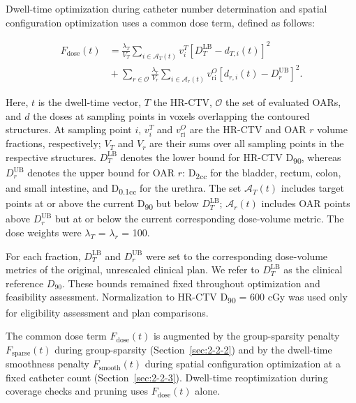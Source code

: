 \documentclass[12pt,twoside,letterpaper]{article}
\begin{document}
Dwell-time optimization during catheter number determination and spatial configuration optimization uses a common dose term, defined as follows:

\begin{equation}\label{eq:1}
\begin{aligned}F_{\text{dose}}\left( t \right) &= \frac{\lambda_{T}}{V_{T}}\sum_{i \in \mathcal{A}_{T}\left( t \right)}^{}{v_{i}^{T}\left\lbrack D_{T}^{\text{LB}} - d_{T,i}(t) \right\rbrack^{2}}\\ &{}+\sum_{r \in \mathcal{O}}^{}{\frac{\lambda_{r}}{V_{r}}\sum_{i \in \mathcal{A}_{r}\left( t \right)}^{}{v_{\text{ri}}^{O}\left\lbrack d_{r,i}\left( t \right) - D_{r}^{\text{UB}} \right\rbrack^{2}}}.\end{aligned}
\end{equation}

Here, $t$ is the dwell-time vector, $T$ the HR-CTV, $\mathcal{O}$ the set of evaluated OARs, and $d$ the doses at sampling points in voxels overlapping the contoured structures. At sampling point $i$, $v_{i}^{T}$ and $v_{\text{ri}}^{O}$ are the HR-CTV and OAR $r$ volume fractions, respectively; $V_{T}$ and $V_{r}$ are their sums over all sampling points in the respective structures. $D_{T}^{\text{LB}}$ denotes the lower bound for HR-CTV D\textsubscript{90}, whereas $D_{r}^{\text{UB}}$ denotes the upper bound for OAR $r$: D\textsubscript{2cc} for the bladder, rectum, colon, and small intestine, and D\textsubscript{0.1cc} for the urethra. The set $\mathcal{A}_{T}\left( t \right)$ includes target points at or above the current D\textsubscript{90} but below $D_{T}^{\text{LB}}$; $\mathcal{A}_{r}\left( t \right)$ includes OAR points above $D_{r}^{\text{UB}}$ but at or below the current corresponding dose-volume metric. The dose weights were $\lambda_{T}$ = $\lambda_{r}$ = 100.

For each fraction, $D_{T}^{\text{LB}}$ and $D_{r}^{\text{UB}}$ were set to the corresponding dose-volume metrics of the original, unrescaled clinical plan. We refer to $D_{T}^{\text{LB}}$ as the clinical reference $D_{90}$. These bounds remained fixed throughout optimization and feasibility assessment. Normalization to HR-CTV D\textsubscript{90} = 600 cGy was used only for eligibility assessment and plan comparisons.

The common dose term $F_{\text{dose}}\left( t \right)$ is augmented by the group-sparsity penalty $F_{\text{sparse}}\left( t \right)$ during group-sparsity (Section~\ref{sec:2-2-2}) and by the dwell-time smoothness penalty $F_{\text{smooth}}\left( t \right)$ during spatial configuration optimization at a fixed catheter count (Section~\ref{sec:2-2-3}). Dwell-time reoptimization during coverage checks and pruning uses $F_{\text{dose}}\left( t \right)$ alone.
\end{document}
